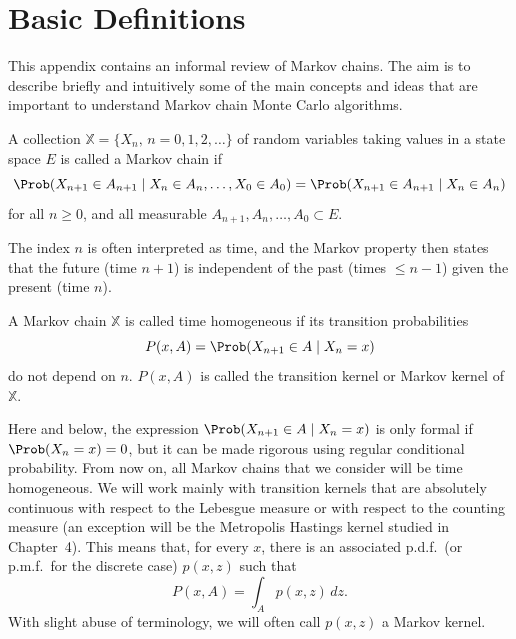 \section{Basic Definitions}
\label{sec:A.1}

This appendix contains an informal review of Markov chains. The aim is to describe briefly and
intuitively some of the main concepts and ideas that are important to understand Markov chain
Monte Carlo algorithms.

\begin{definition}
\label{def:A.1}
A collection $\mathbb{X} = \{X_n,\, n = 0, 1, 2, \ldots\}$ of random variables taking values in a
state space $E$ is called a Markov chain if
\[
  \Prob(X_{n+1} \in A_{n+1} \mid X_n \in A_n, \ldots, X_0 \in A_0)
  = \Prob(X_{n+1} \in A_{n+1} \mid X_n \in A_n)
\]
for all $n \geq 0$, and all measurable $A_{n+1}, A_n, \ldots, A_0 \subset E$.
\end{definition}

The index $n$ is often interpreted as time, and the Markov property then states that the future
(time $n+1$) is independent of the past (times $\leq n-1$) given the present (time $n$).

\begin{definition}
\label{def:A.2}
A Markov chain $\mathbb{X}$ is called time homogeneous if its transition probabilities
\[
  P(x, A) = \Prob(X_{n+1} \in A \mid X_n = x)
\]
do not depend on $n$. $P(x, A)$ is called the transition kernel or Markov kernel of $\mathbb{X}$.
\end{definition}

Here and below, the expression $\Prob(X_{n+1} \in A \mid X_n = x)$ is only formal if $\Prob(X_n = x) = 0$,
but it can be made rigorous using regular conditional probability.  From now on, all Markov
chains that we consider will be time homogeneous.  We will work mainly with transition kernels
that are absolutely continuous with respect to the Lebesgue measure or with respect to the counting
measure (an exception will be the Metropolis Hastings kernel studied in Chapter~4).  This
means that, for every $x$, there is an associated p.d.f.\ (or p.m.f.\ for the discrete case)
$p(x, z)$ such that
\[
  P(x, A) = \int_A p(x, z)\, dz.
\]
With slight abuse of terminology, we will often call $p(x, z)$ a Markov kernel.

